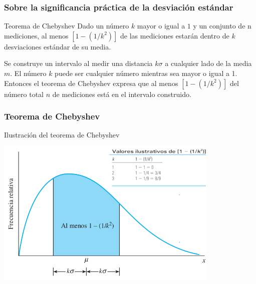 \documentclass[spanish]{beamer}
\begin{document}
\begin{frame}
\frametitle{Sobre la significancia práctica de la desviación estándar}

\begin{block}{Teorema de Chebyshev}
Dado un número $k$ mayor o igual a $1$ y un conjunto de n mediciones, al menos $[1 - (1/k^2)]$ de las mediciones estarán dentro de $k$ desviaciones estándar de su media.
\end{block}

Se construye un intervalo al medir una distancia $k\sigma$ a cualquier lado de la media $m$. El número $k$ puede ser cualquier número mientras sea mayor o igual a 1. Entonces el teorema de Chebyshev expresa que al menos $[1 - (1/k^2)]$ del número total $n$ de mediciones está en el intervalo construido.

\end{frame}
\begin{frame}
\frametitle{Teorema de Chebyshev}
Ilustración del teorema de Chebyshev
\begin{center}
\includegraphics[width=0.8\textwidth]{im17}
\end{center}


\end{frame}
\end{document}
